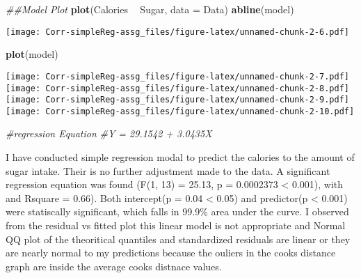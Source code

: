 \documentclass[]{article}
\newenvironment{Shaded}{\begin{snugshade}}{\end{snugshade}}
\newcommand{\CommentTok}[1]{\textcolor[rgb]{0.56,0.35,0.01}{\textit{#1}}}
\newcommand{\DataTypeTok}[1]{\textcolor[rgb]{0.13,0.29,0.53}{#1}}
\newcommand{\KeywordTok}[1]{\textcolor[rgb]{0.13,0.29,0.53}{\textbf{#1}}}
\newcommand{\NormalTok}[1]{#1}
\newcommand{\OperatorTok}[1]{\textcolor[rgb]{0.81,0.36,0.00}{\textbf{#1}}}
\newcommand{\StringTok}[1]{\textcolor[rgb]{0.31,0.60,0.02}{#1}}
\begin{document}
\begin{Shaded}
\begin{Highlighting}[]
\CommentTok{##Model Plot}
\KeywordTok{plot}\NormalTok{(Calories }\OperatorTok{~}\StringTok{ }\NormalTok{Sugar, }\DataTypeTok{data =}\NormalTok{ Data)}
\KeywordTok{abline}\NormalTok{(model)}
\end{Highlighting}
\end{Shaded}

\texttt{[image: Corr-simpleReg-assg\_files/figure-latex/unnamed-chunk-2-6.pdf]}

\begin{Shaded}
\begin{Highlighting}[]
\KeywordTok{plot}\NormalTok{(model)}
\end{Highlighting}
\end{Shaded}

\texttt{[image: Corr-simpleReg-assg\_files/figure-latex/unnamed-chunk-2-7.pdf]}
\texttt{[image: Corr-simpleReg-assg\_files/figure-latex/unnamed-chunk-2-8.pdf]}
\texttt{[image: Corr-simpleReg-assg\_files/figure-latex/unnamed-chunk-2-9.pdf]}
\texttt{[image: Corr-simpleReg-assg\_files/figure-latex/unnamed-chunk-2-10.pdf]}

\begin{Shaded}
\begin{Highlighting}[]
\CommentTok{#regression Equation}
\CommentTok{#Y = 29.1542 + 3.0435X }
\end{Highlighting}
\end{Shaded}

I have conducted simple regression modal to predict the calories to the
amount of sugar intake. Their is no further adjustment made to the data.
A significant regression equation was found (F(1, 13) = 25.13, p =
0.0002373 \textless{} 0.001), with and Rsquare = 0.66). Both intercept(p
= 0.04 \textless{} 0.05) and predictor(p \textless{} 0.001) were
statiscally significant, which falls in 99.9\% area under the curve. I
observed from the residual vs fitted plot this linear model is not
appropriate and Normal QQ plot of the theoritical quantiles and
standardized residuals are linear or they are nearly normal to my
predictions because the ouliers in the cooks distance graph are inside
the average cooks distnace values.
\end{document}
